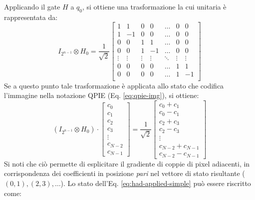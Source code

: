 Applicando il gate $H$ a $q_0$, si ottiene una trasformazione la cui unitaria è
rappresentata da:
\begin{equation*}
	I_{2^{n-1}} \otimes H_0 = \frac{1}{\sqrt 2}\begin{bmatrix}
		1 & 1 & 0 & 0 & \ldots & 0 & 0\\
		1 & -1 & 0 & 0 & \ldots & 0 & 0\\
		0 & 0 & 1 & 1 & \ldots & 0 & 0\\
		0 & 0 & 1 & -1 & \ldots & 0 & 0\\
		\vdots & \vdots & \vdots & \vdots & \ddots & \vdots & \vdots\\
		0 & 0 & 0 & 0 & \ldots & 1 & 1\\
		0 & 0 & 0 & 0 & \ldots & 1 & -1\\
	\end{bmatrix}
\end{equation*}
Se a questo punto tale trasformazione è applicata allo stato che codifica
l'immagine nella notazione QPIE (Eq. \ref{eq:qpie-img}), si
ottiene:
\begin{equation}\label{eq:had-applied-simple}
	(I_{2^{n-1}} \otimes H_0) \cdot \begin{bmatrix}
		c_0\\ c_1\\ c_2\\ c_3\\ \vdots\\ c_{N-2}\\ c_{N-1}
	\end{bmatrix} = \frac{1}{\sqrt 2} \begin{bmatrix}
		c_0+c_1\\ c_0-c_1\\ c_2+c_3\\ c_2-c_3\\ \vdots\\ c_{N-2}+c_{N-1}\\ c_{N-2}-c_{N-1}
	\end{bmatrix}
\end{equation}
Si noti che ciò permette di esplicitare il gradiente di coppie di pixel adiacenti, in corrispondenza dei coefficienti in posizione \emph{pari} nel vettore di stato risultante ($(0,1), (2,3), \ldots$). Lo stato dell'Eq. \ref{eq:had-applied-simple} può essere riscritto come:
